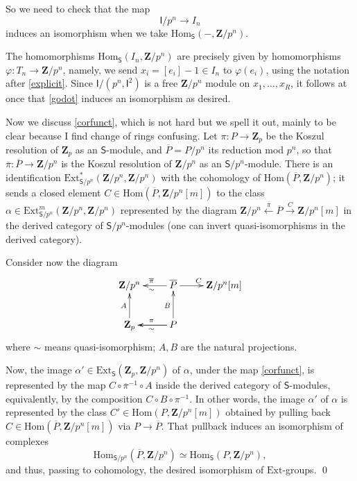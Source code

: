\documentclass[10pt]{amsart}
\newcommand{\Z}{\mathbf{Z}}
\newcommand{\Ext}{\mathrm{Ext}}
\newcommand{\Hom}{\mathrm{Hom}}
\newcommand{\Sinf}{\mathsf{S}}
\newcommand{\Iinf}{\mathsf{I}}
\theoremstyle{remark}
\begin{document}
So we need to check that the map 
\begin{equation} \label{godot} \Iinf/p^n \rightarrow I_n\end{equation}
induces an isomorphism when we take $\Hom_{\Sinf}(-, \Z/p^n)$.

The homomorphisms $\Hom_{\Sinf}(I_n, \Z/p^n)$ are precisely given by homomorphisms
$\varphi: T_n \rightarrow \Z/p^n$, namely, we send $x_i = [e_i] -1 \in I_n$  to  $\varphi(e_i)$,
using the notation after \eqref{explicit}.  
Since $\Iinf/(p^n, \Iinf^2)$ is a free $\Z/p^n$ module on $x_1, \dots, x_{R}$,
it follows at once that \eqref{godot} induces an isomorphism as desired. 
 
%
%
%
%
%
%
%
%
%
%
%
%
%
 
 Now we discuss \eqref{corfunct}, which is not hard but we spell it out, mainly to be clear because 
 I find change of rings confusing.  
 Let $\pi: P \rightarrow \Z_p$ be the Koszul  resolution of $\Z_p$
 as an $\Sinf$-module, and $\overline{P} = P/p^n$ its reduction mod $p^n$, 
 so that $\overline{\pi}: \overline{P} \rightarrow \Z/p^n$ is the Koszul resolution of $\Z/p^n$ as an $\Sinf/p^n$-module.  
 There is an identification $\Ext^*_{\Sinf/p^n}(\Z/p^n, \Z/p^n)$
 with the cohomology of $\Hom(\overline{P}, \Z/p^n)$; it sends a closed element $C \in  \Hom(\overline{P}, \Z/p^n[m])$ to the class 
  $\alpha \in \Ext^m_{\Sinf/p^n}(\Z/p^n, \Z/p^n)$
  represented by   the diagram $\Z/p^n \stackrel{\overline{\pi}}{\longleftarrow} \overline{P}  \stackrel{C}{\rightarrow} \Z/p^n[m]$
 in the derived category of $\Sinf/p^n$-modules (one can invert quasi-isomorphisms in the derived category).  
 
 Consider now the diagram  
 \begin{equation} \label{feeling_groovy0}
 \xymatrix{
\Z/p^n    & \overline{P}   \ar[l]^{\sim}_{ \overline{\pi}} \ar[r]^C  & \Z/p^n[m]   \\
\Z_p    \ar[u]^{A}  & \ar[l]^{\sim}_{\pi} P \ar[l] \ar[u]^B   \\
 }
 \end{equation}
 where $\sim$ means quasi-isomorphism; $A,B$ are the natural projections.

   Now, the image $\alpha'  \in \Ext_{\Sinf}(\Z_p, \Z/p^n)$ of $\alpha$, under the map \eqref{corfunct}, 
is represented by the map $C \circ \overline{\pi}^{-1} \circ A$  inside the derived category of $\Sinf$-modules, equivalently, by the composition
$C \circ B \circ \pi^{-1}$.  
In other words, the image $\alpha'$ of $\alpha$ is represented by the class $C' \in \Hom(P, \Z/p^n[m])$ obtained by pulling back
$ C \in \Hom(\overline{P}, \Z/p^n[m])$ via $P \rightarrow \overline{P}$.  That  pullback induces an isomorphism of complexes 
$$\Hom_{\Sinf/p^n}(\overline{P}, \Z/p^n) \simeq \Hom_{\Sinf}(P, \Z/p^n),$$ and thus, passing to cohomology, the desired isomorphism of $\Ext$-groups. 
\fi
\qed 
\end{document}
